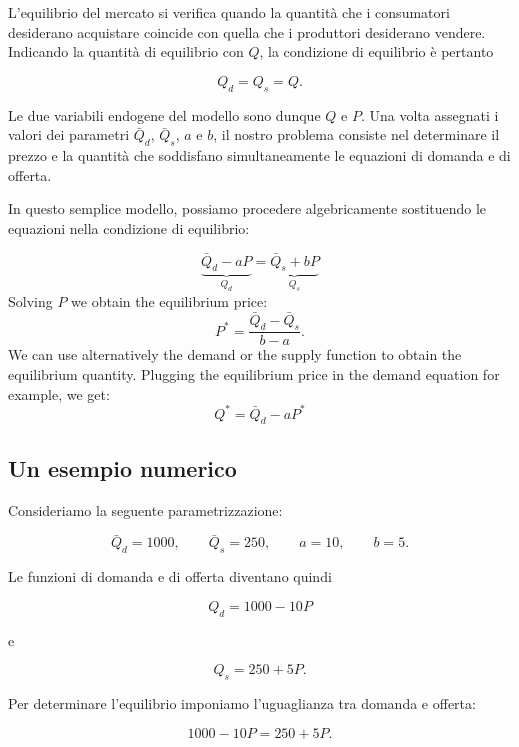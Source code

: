 L'equilibrio del mercato si verifica quando la quantità che i
consumatori desiderano acquistare coincide con quella che i produttori
desiderano vendere. Indicando la quantità di equilibrio con $Q$, la
condizione di equilibrio è pertanto

\begin{equation*}
    Q_d = Q_s = Q.
    \label{eq:equilibrio}
\end{equation*}

Le due variabili endogene del modello sono dunque $Q$ e $P$.
Una volta assegnati i valori dei parametri
$\bar{Q}_d$, $\bar{Q}_s$, $a$ e $b$, il nostro problema consiste nel
determinare il prezzo e la quantità che soddisfano simultaneamente
le equazioni di domanda e di offerta.

In questo semplice modello, possiamo procedere algebricamente sostituendo le equazioni nella condizione di equilibrio:

$$
\underbrace{\bar{Q}_d - aP}_{Q_d}=\underbrace{\bar{Q}_s + bP}_{Q_s}
$$
Solving $P$ we obtain the equilibrium price:
$$
P^*=\frac{\bar Q_d-\bar Q_s}{b-a}.
\label{eq:eqp}
$$
We can use alternatively the demand or the supply function to obtain the equilibrium quantity. Plugging the equilibrium price in the demand equation for example, we get:
$$
Q^*=\bar{Q}_d - aP^*
\label{eq:eqq}
$$

\subsection{Un esempio numerico}

Consideriamo la seguente parametrizzazione:

\begin{equation*}
    \bar{Q}_d = 1000,
    \qquad
    \bar{Q}_s = 250,
    \qquad
    a = 10,
    \qquad
    b = 5.
\end{equation*}

Le funzioni di domanda e di offerta diventano quindi

\begin{equation*}
    Q_d = 1000 - 10P
\end{equation*}

e

\begin{equation*}
    Q_s = 250 + 5P.
\end{equation*}

Per determinare l'equilibrio imponiamo l'uguaglianza tra domanda
e offerta:

\begin{equation*}
    1000 - 10P = 250 + 5P.
\end{equation*}

